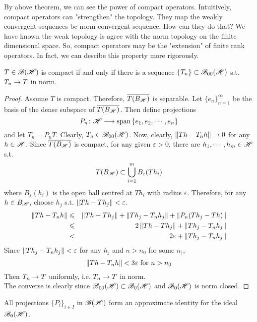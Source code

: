 By above theorem, we can see the power of compact operators. Intuitively, compact operators can "strengthen" the topology. They map the weakly convergent sequences be norm convergent sequence. How can they do that? We have known the weak topology is agree with the norm topology on the finite dimensional space. So, compact operators may be the "extension" of finite rank operators. In fact, we can descibe this property more rigorously.

\begin{thm}
	$T \in \mathscr{B(H)}$ is compact if and only if there is a sequence $\{T_n\} \subset \mathscr{B}_{00}\mathscr{(H)}$ s.t. $T_n \rightarrow T$ in norm.
\end{thm}
\begin{proof}
	Assume $T$ is compact. Therefore, $\overline{T(B_{\mathscr{H}})}$ is separable. Let $\{e_n\}_{n=1}^{\infty}$ be the basis of the dense subspace of $\overline{T(B_{\mathscr{H}})}$. Then define projections
	\begin{equation*}
		P_n \colon \mathscr{H} \longrightarrow \operatorname{span}{\{e_1, e_2, \cdots, e_n\}}
	\end{equation*}
	and let $T_n = P_nT$. Clearly, $T_n \in \mathscr{B}_{00}\mathscr{(H)}$. Now, clearly, $\left\lVert Th - T_nh\right\lVert \rightarrow 0$ for any $h \in \mathscr{H}$. Since $\overline{T(B_{\mathscr{H}})}$ is compact, for any given $\varepsilon > 0$, there are $h_1, \cdots, h_m \in \mathscr{H}$ s.t.
	\begin{equation*}
		T(B_{\mathscr{H}}) \subset \bigcup_{i=1}^{m}B_{\varepsilon}(Th_i)
	\end{equation*}
	where $B_{\varepsilon}(h_i)$ is the open ball centred at $Th_i$ with radius $\varepsilon$. Therefore, for any $h \in B_{\mathscr{H}}$, choose $h_j$ s.t. $\left\lVert Th-Th_j\right\lVert < \varepsilon$.
	\begin{eqnarray*}
		\left\lVert Th-T_nh\right\lVert &\leqslant& \left\lVert Th - Th_j\right\lVert + \left\lVert Th_j - T_nh_j\right\lVert + \left\lVert P_n(Th_j-Th)\right\lVert \\
		&\leqslant& 2\left\lVert Th - Th_j\right\lVert +  \left\lVert Th_j - T_nh_j\right\lVert \\
		&<& 2\varepsilon +  \left\lVert Th_j - T_nh_j\right\lVert
	\end{eqnarray*}
	Since $\left\lVert Th_j - T_{n}h_j\right\lVert < \varepsilon$ for any $h_j$ and $n > n_0$ for some $n_)$,  
	\begin{equation*}
		\left\lVert Th-T_nh\right\lVert < 3\varepsilon \text{ for } n > n_0
	\end{equation*}
	Then $T_n \rightarrow T$ uniformly, i.e. $T_n \rightarrow T$ in norm. \\
	The converse is clearly since $\mathscr{B}_{00}\mathscr{(H)} \subset \mathscr{B}_{0}\mathscr{(H)}$ and $\mathscr{B}_{0}\mathscr{(H)}$ is norm closed.
\end{proof}
\begin{cor}
	All projections $\{P_i\}_{i \in I}$ in $\mathscr{B(H)}$ form an approximate identity for the ideal $\mathscr{B}_{0}\mathscr{(H)}$.
\end{cor}

